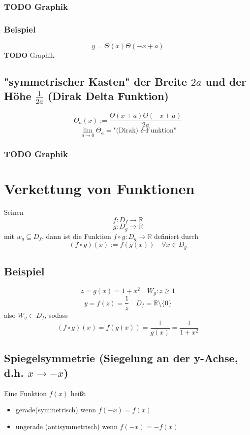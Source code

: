 \documentclass[11pt]{article}
\DeclareMathOperator{\Forall}{\forall}
\begin{document}
\subsubsection{{\bfseries\sffamily TODO} Graphik}
\label{sec-6-2-1}
\subsubsection{Beispiel}
\label{sec-6-2-2}
\[y=\Theta(x)\Theta(-x+a)\]
\textbf{TODO} Graphik
\subsection{"symmetrischer Kasten" der Breite $2a$ und der Höhe $\frac{1}{2a}$ (Dirak Delta Funktion)}
\label{sec-6-3}
\[\Theta_a (x):=\frac{\Theta(x+a)\Theta(-x+a)}{2a}\]
\[\lim_{a\to 0}\Theta_a=\text{"(Dirak) $\delta$-Funktion"}\]
\subsubsection{{\bfseries\sffamily TODO} Graphik}
\label{sec-6-3-1}
\section{Verkettung von Funktionen}
\label{sec-7}
Seinen \[f:D_f \to \mathbb{R}\] \[g:D_g\to\mathbb{R}\] mit $w_g \subseteq D_f$, dann ist die Funktion $f\circ g: D_g\to\mathbb{R}$ definiert durch \[(f\circ g)(x):=f(g(x))\quad\Forall x\in D_g\]
\subsection{Beispiel}
\label{sec-7-1}
\[z = g(x) = 1+x^2\quad W_g: z\geq 1\]
\[y=f(z)=\frac{1}{z}\quad D_f=\mathbb{R}\setminus\{0\}\]
also $W_g\subset D_f$, sodass \[(f\circ g)(x)=f(g(x)) = \frac{1}{g(x)}= \frac{1}{1+x^2}\]
\subsection{Spiegelsymmetrie (Siegelung an der y-Achse, d.h. $x\to -x$)}
\label{sec-7-2}
Eine Funktion $f(x)$ heißt
\begin{itemize}
\item gerade(symmetrisch) wenn $f(-x) = f(x)$
\item ungerade (antisymmetrisch) wenn $f(-x) = -f(x)$
\end{itemize}
\end{document}
